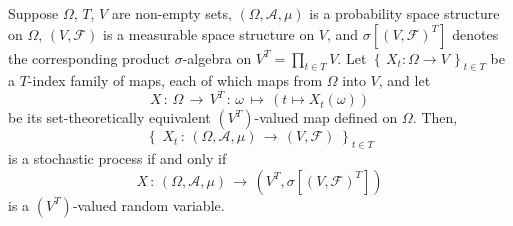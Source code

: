 \begin{corollary}
\mbox{}\vskip 0.1cm
\noindent
Suppose $\Omega$, $T$, $V$ are non-empty sets,
$\left(\Omega,\mathcal{A},\mu\right)$ is a probability space structure on $\Omega$,
$\left(V,\mathcal{F}\right)$ is a measurable space structure on $V$, and
$\sigma[(V,\mathcal{F})^{T}]$ denotes the corresponding product $\sigma$-algebra
on $V^{T} = \prod_{t\in T}V$.
Let $\left\{\,X_{t} : \Omega \longrightarrow V \,\right\}_{t \in T}$
be a $T$-index family of maps, each of which maps from $\Omega$ into $V$,
and let
\begin{equation*}
X \,:\, \Omega \,\longrightarrow\, V^{T} \,:\, \omega \,\longmapsto\, \left(t \longmapsto X_{t}(\omega)\right)
\end{equation*}
be its set-theoretically equivalent $(V^{T})$-valued map defined on $\Omega$.
Then,
\begin{equation*}
\left\{\; X_{t} \,:\, \left(\Omega,\mathcal{A},\mu\right)\,\longrightarrow\,\left(V,\mathcal{F}\right) \;\right\}_{t \in T}
\end{equation*}
is a stochastic process if and only if
\begin{equation*}
X \,:\, \left(\Omega,\mathcal{A},\mu\right)\,\longrightarrow\,\left(V^{T},\sigma[(V,\mathcal{F})^{T}]\right)
\end{equation*}
is a $(V^{T})$-valued random variable.
\end{corollary}

